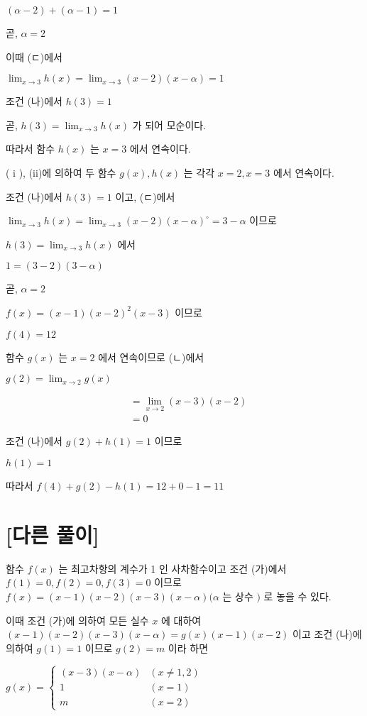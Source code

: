 \documentclass[10pt]{article}
\begin{document}
\((\alpha-2)+(\alpha-1)=1\)

곧, \(\alpha=2\)

이때 (ㄷ)에서

\(\lim _{x \rightarrow 3} h(x)=\lim _{x \rightarrow 3}(x-2)(x-\alpha)=1\)

조건 (나)에서 \(h(3)=1\)

곧, \(h(3)=\lim _{x \rightarrow 3} h(x)\) 가 되어 모순이다.

따라서 함수 \(h(x)\) 는 \(x=3\) 에서 연속이다.

( i ), (ii)에 의하여 두 함수 \(g(x), h(x)\) 는 각각 \(x=2, x=3\) 에서 연속이다.

조건 (나)에서 \(h(3)=1\) 이고, (ㄷ)에서

\(\lim _{x \rightarrow 3} h(x)=\lim _{x \rightarrow 3}(x-2)(x-\alpha)^{\circ}=3-\alpha\) 이므로

\(h(3)=\lim _{x \rightarrow 3} h(x)\) 에서

\(1=(3-2)(3-\alpha)\)

곧, \(\alpha=2\)

\(f(x)=(x-1)(x-2)^{2}(x-3)\) 이므로

\(f(4)=12\)

함수 \(g(x)\) 는 \(x=2\) 에서 연속이므로 (ㄴ)에서

\(g(2)=\lim _{x \rightarrow 2} g(x)\)

\[
\begin{aligned}
& =\lim _{x \rightarrow 2}(x-3)(x-2) \\
& =0
\end{aligned}
\]

조건 (나)에서 \(g(2)+h(1)=1\) 이므로

\(h(1)=1\)

따라서 \(f(4)+g(2)-h(1)=12+0-1=11\)

\section*{[다른 풀이]}
함수 \(f(x)\) 는 최고차항의 계수가 1 인 사차함수이고 조건 (가)에서 \(f(1)=0, f(2)=0, f(3)=0\) 이므로 \(f(x)=(x-1)(x-2)(x-3)(x-\alpha)(\alpha\) 는 상수 \()\) 로 놓을 수 있다.

이때 조건 (가)에 의하여 모든 실수 \(x\) 에 대하여 \((x-1)(x-2)(x-3)(x-\alpha)=g(x)(x-1)(x-2)\) 이고 조건 (나)에 의하여 \(g(1)=1\) 이므로 \(g(2)=m\) 이라 하면

\(g(x)= \begin{cases}(x-3)(x-\alpha) & (x \neq 1,2) \\ 1 & (x=1) \\ m & (x=2)\end{cases}\)
\end{document}
